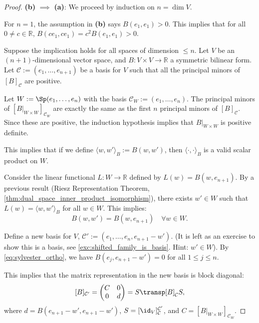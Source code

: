 \begin{proof}
\textbf{(b)} $\implies$ \textbf{(a)}: We proceed by induction on $n = \dim V$.

For $n = 1$, the assumption in \textbf{(b)} says $B(e_1, e_1) > 0$. This implies that for all $0 \neq c \in \mathbb{R}$, $B(c e_1, c e_1) = c^2 B(e_1, e_1) > 0$.

Suppose the implication holds for all spaces of dimension $\le n$. Let $V$ be an $(n+1)$-dimensional vector space, and $B \colon V \times V \to \mathbb{R}$ a symmetric bilinear form. Let $\mathcal{C} := (e_1, \dots, e_{n+1})$ be a basis for $V$ such that all the principal minors of $[B]_{\mathcal{C}}$ are positive.

Let $W := \Sp(e_1, \dots, e_n)$ with the basis $\mathcal{C}_W := (e_1, \dots, e_n)$.
The principal minors of $[B|_{W \times W}]_{\mathcal{C}_W}$ are exactly the same as the first $n$ principal minors of $[B]_{\mathcal{C}}$. Since these are positive, the induction hypothesis implies that $B|_{W \times W}$ is positive definite.

This implies that if we define $\langle w, w' \rangle_B := B(w, w')$, then $\langle \cdot, \cdot \rangle_B$ is a valid scalar product on $W$.

Consider the linear functional $L \colon W \to \mathbb{R}$ defined by $L(w) = B(w, e_{n+1})$.
By a previous result (Riesz Representation Theorem, \cref{thm:dual_space_inner_product_isomorphism}), there exists $w' \in W$ such that $L(w) = \langle w, w' \rangle_B$ for all $w \in W$. This implies:
\begin{equation}
\label{eq:sylvester_ortho}
B(w, w') = B(w, e_{n+1}) \quad \forall w \in W.
\end{equation}

Define a new basis for $V$, $\mathcal{C}' := (e_1, \dots, e_n, e_{n+1} - w')$. (It is left as an exercise to show this is a basis, see \cref{exc:shifted_family_is_basis}. Hint: $w' \in W$).
By \eqref{eq:sylvester_ortho}, we have $B(e_j, e_{n+1} - w') = 0$ for all $1 \le j \le n$. 

This implies that the matrix representation in the new basis is block diagonal:
\[
[B]_{\mathcal{C}'} = \begin{pmatrix} C & 0 \\ 0 & d \end{pmatrix} = S\transp [B]_{\mathcal{C}} S,
\]
where $d = B(e_{n+1} - w', e_{n+1} - w')$, $S = [\id_V]_{\mathcal{C}}^{\mathcal{C}'}$, and $C = [B|_{W \times W}]_{\mathcal{C}_W}$.


\end{proof}

